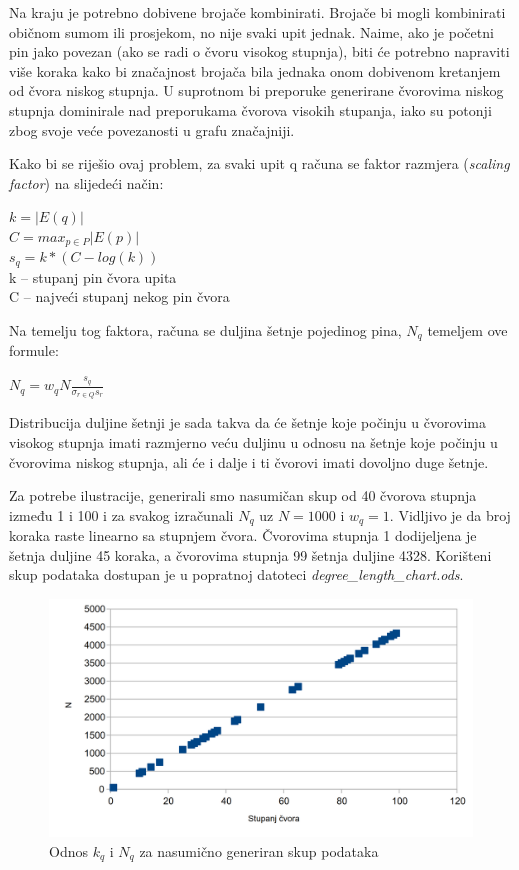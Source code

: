 \documentclass[times, utf8, seminar]{fer}
\begin{document}
Na kraju je potrebno dobivene brojače kombinirati. Brojače bi mogli kombinirati običnom sumom ili prosjekom, no nije svaki upit jednak. Naime, ako je početni pin jako povezan (ako se radi o čvoru visokog stupnja), biti će potrebno napraviti više koraka kako bi značajnost brojača bila jednaka onom dobivenom kretanjem od čvora niskog stupnja. U suprotnom bi preporuke generirane čvorovima niskog stupnja dominirale nad preporukama čvorova visokih stupanja, iako su potonji zbog svoje veće povezanosti u grafu značajniji.

Kako bi se riješio ovaj problem, za svaki upit q računa se faktor razmjera (\textit{scaling factor}) na slijedeći način:

\begin{centering}
		  $ k = |E(q)| $ \\
		  $ C = max_{p \in P}|E(p)| $ \\
		  $ s_q = k * (C - log(k)) $ \\
        k -- stupanj pin čvora upita \\
		  C -- najveći stupanj nekog pin čvora 
		  \par
\end{centering}

Na temelju tog faktora, računa se duljina šetnje pojedinog pina, $N_q$ temeljem ove formule:

\begin{centering}
	$ N_q = w_qN\frac{s_q}{\sigma_{r \in Q}s_r} $\par
\end{centering}

Distribucija duljine šetnji je sada takva da će šetnje koje počinju u čvorovima visokog stupnja imati razmjerno veću duljinu u odnosu na šetnje koje počinju u čvorovima niskog stupnja, ali će i dalje i ti čvorovi imati dovoljno duge šetnje.

Za potrebe ilustracije, generirali smo nasumičan skup od 40 čvorova stupnja između 1 i 100 i za svakog izračunali $N_q$ uz $N = 1000$ i $w_q = 1$. Vidljivo je da broj koraka raste linearno sa stupnjem čvora. Čvorovima stupnja 1 dodijeljena je šetnja duljine 45 koraka, a čvorovima stupnja 99 šetnja duljine 4328. Korišteni skup podataka dostupan je u popratnoj datoteci \textit{degree\_length\_chart.ods}.

\begin{figure}[h]
	\centering
	\includegraphics[width=\textwidth]{degree_chart}
	\caption{Odnos $k_q$ i $N_q$ za nasumično generiran skup podataka}
	\label{fig:pins_boards}
\end{figure}
\end{document}
